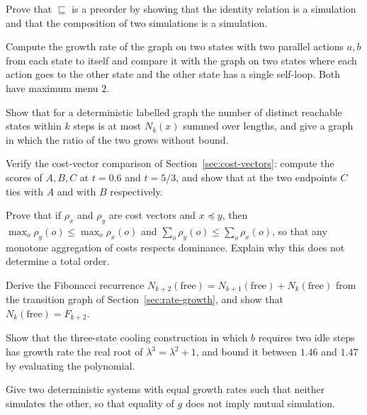\begin{exercise}
Prove that $\sqsubseteq$ is a preorder by showing that the identity relation is a simulation and that the composition of two simulations is a simulation.
\end{exercise}

\begin{exercise}\label{ex:growth}
Compute the growth rate of the graph on two states with two parallel actions $a,b$ from each state to itself and compare it with the graph on two states where each action goes to the other state and the other state has a single self-loop. Both have maximum menu $2$.
\end{exercise}

\begin{exercise}
Show that for a deterministic labelled graph the number of distinct reachable states within $k$ steps is at most $N_k(x)$ summed over lengths, and give a graph in which the ratio of the two grows without bound.
\end{exercise}

\begin{exercise}
Verify the cost-vector comparison of Section~\ref{sec:cost-vectors}: compute the scores of $A,B,C$ at $t=0.6$ and $t=5/3$, and show that at the two endpoints $C$ ties with $A$ and with $B$ respectively.
\end{exercise}

\begin{exercise}
Prove that if $\rho_x$ and $\rho_y$ are cost vectors and $x\preceq y$, then $\max_o\rho_y(o)\le\max_o\rho_x(o)$ and $\sum_o\rho_y(o)\le\sum_o\rho_x(o)$, so that any monotone aggregation of costs respects dominance. Explain why this does not determine a total order.
\end{exercise}

\begin{exercise}
Derive the Fibonacci recurrence $N_{k+2}(\mathrm{free})=N_{k+1}(\mathrm{free})+N_k(\mathrm{free})$ from the transition graph of Section~\ref{sec:rate-growth}, and show that $N_k(\mathrm{free})=F_{k+2}$.
\end{exercise}

\begin{exercise}
Show that the three-state cooling construction in which $b$ requires two idle steps has growth rate the real root of $\lambda^3=\lambda^2+1$, and bound it between $1.46$ and $1.47$ by evaluating the polynomial.\label{ex2:cubic}
\end{exercise}

\begin{exercise}
Give two deterministic systems with equal growth rates such that neither simulates the other, so that equality of $g$ does not imply mutual simulation.
\end{exercise}


